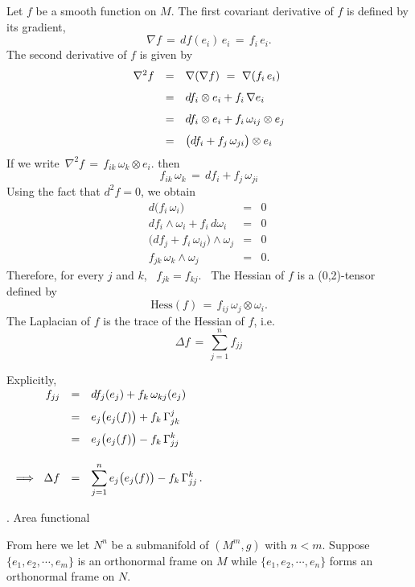\documentclass{article}[12pt,a4paper]
\begin{document}
Let $f$ be a smooth function on $M$. The first covariant derivative of $f$ 
is defined by its gradient, 
$$ \nabla f \,=\, df(e_i)\, e_i \,=\, f_i\, e_i. $$
The second derivative of $f$ is given by
$$ \begin{array}{rcl}
\nabla^2 f &=& \nabla(\nabla f) \mbox{ }=\mbox{ } \nabla(f_i\, e_i) \\[0.1in]
&=& df_i \otimes e_i + f_i\, \nabla e_i \\[0.1in]
&=& df_i \otimes e_i + f_i\, \omega_{ij} \otimes e_j \\[0.1in]
&=& \big(df_i + f_j\, \omega_{ji}\big) \otimes e_i 
\end{array}$$
If we write \,$\nabla^2 f \,=\, f_{ik}\, \omega_k \otimes e_i$. then 
\begin{equation}
f_{ik}\, \omega_k \,=\, df_i + f_j\, \omega_{ji}
\end{equation}
Using the fact that $d^2f = 0$, we obtain
$$\begin{array}{rcl}
d\big(f_i \, \omega_i\big) &=& 0 \\[0.1in]
df_i \wedge \omega_i + f_i\, d\omega_i &=& 0 \\[0.1in]
\big(df_j + f_i\, \omega_{ij}\big)\wedge \omega_j &=& 0 \\[0.1in]
f_{jk}\, \omega_k \wedge \omega_j &=& 0.
\end{array}$$
Therefore, for every $j$ and $k$, \, $f_{jk} = f_{kj}$. \,
The Hessian of $f$ is a (0,2)-tensor defined by 
$$ \mbox{Hess}(f) \,=\, f_{ij}\, \omega_j \otimes \omega_i. $$
The Laplacian of $f$ is the trace of the Hessian of $f$, i.e.
\begin{equation}
\Delta f \,=\, \sum_{j=1}^n f_{jj}
\end{equation}
\newpage

Explicitly, \\[0.1in]
$\begin{array}{rcl}
f_{jj} &=& \displaystyle df_j(e_j) + f_k\,\omega_{kj}(e_j) \\[0.1in]
&=& \displaystyle e_j\big(e_j(f)\big) + f_k\, \Gamma_{jk}^j \\[0.1in]
&=& \displaystyle e_j\big(e_j(f)\big) - f_k\, \Gamma_{jj}^k \\[0.2in]
\implies \mbox{ } \Delta f &=& \displaystyle 
	\sum_{j=1}^n e_j\big(e_j(f)\big) - f_k\, \Gamma_{jj}^k \,.\\ 
\end{array}$ \\[0.2in]

\begin{center} {. Area functional}\end{center}
From here we let $N^n$ be a submanifold of $(M^m, g)$ with $n<m$. 
Suppose $\{e_1, e_2, \cdots, e_m\}$ is an orthonormal frame on $M$
while $\{e_1, e_2, \cdots, e_n\}$ forms an orthonormal frame on $N$. \\
\end{document}
